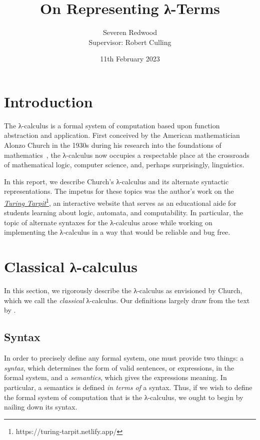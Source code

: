 \documentclass[headings=standardclasses]{scrartcl}
\title{On Representing λ-Terms}
\author{Severen Redwood \\ {\small Supervisor: Robert Culling}}
\date{11th February 2023}
\theoremstyle{definition}
\begin{document}
\let\oldleq=\leq{}
\let\oldgeq=\geq{}
\renewcommand{\leq}{\leqslant}
\renewcommand{\geq}{\geqslant}

\maketitle

\section{Introduction}

The λ-calculus is a formal system of computation based upon function abstraction
and application. First conceived by the American mathematician Alonzo Church in
the 1930s during his research into the foundations of
mathematics~\parencite{church32, church33, church36}, the λ-calculus now
occupies a respectable place at the crossroads of mathematical logic, computer
science, and, perhaps surprisingly, linguistics.

In this report, we describe Church's λ-calculus and its alternate syntactic
representations. The impetus for these topics was the author's work on the
\href{https://turing-tarpit.netlify.app/}{\emph{Turing
Tarpit}}\footnote{https://turing-tarpit.netlify.app/}, an interactive website
that serves as an educational aide for students learning about logic, automata,
and computability. In particular, the topic of alternate syntaxes for the
λ-calculus arose while working on implementing the λ-calculus in a way that
would be reliable and bug free.

\section{Classical λ-calculus}

In this section, we rigorously describe the λ-calculus as envisioned by Church,
which we call the \emph{classical} λ-calculus. Our definitions largely draw from
the text by \textcite{hindley_seldin08}.

\subsection{Syntax}

In order to precisely define any formal system, one must provide two things: a
\emph{syntax}, which determines the form of valid sentences, or expressions, in
the formal system, and a \emph{semantics}, which gives the expressions meaning.
In particular, a semantics is defined \emph{in terms of} a syntax. Thus, if we
wish to define the formal system of computation that is the λ-calculus, we ought
to begin by nailing down its syntax.
\end{document}
